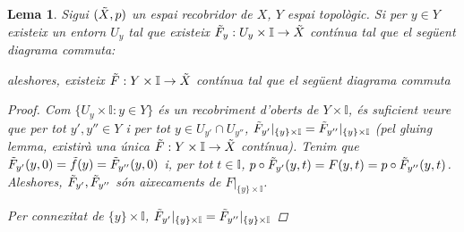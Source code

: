 \documentclass[compress,10pt]{article}
\newtheorem{lema}{Lema}[section]
\theoremstyle{definition}
\begin{document}
\begin{lema}
    Sigui $(\Tilde{X},p)$ un espai recobridor de $X$, $Y$ espai topològic. Si per $y\in Y$ existeix un entorn $U_{y}$ tal que existeix $\Tilde{F}_{y}:U_{y}\times\mathbb{I}\rightarrow\Tilde{X}$ contínua tal que el següent diagrama commuta:
    \begin{center}
    \end{center}
    aleshores, existeix $\Tilde{F}:Y\times\mathbb{I}\rightarrow\Tilde{X}$ contínua tal que el següent diagrama commuta
    \begin{center}
    \end{center}
    \begin{proof}
        Com $\{U_{y}\times\mathbb{I}:y\in Y\}$ és un recobriment d'oberts de $Y\times\mathbb{I}$, és suficient veure que per tot $y',y''\in Y$ i per tot $y\in U_{y'}\cap U_{y''}$, $\Tilde{F}_{y'}|_{\{y\}\times\mathbb{I}}=\Tilde{F}_{y''}|_{\{y\}\times\mathbb{I}}$ (pel \textit{gluing lemma}, existirà una única $\Tilde{F}:Y\times\mathbb{I}\rightarrow\Tilde{X}$ contínua).\newline
        Tenim que $\Tilde{F}_{y'}(y,0)=\Tilde{f}(y)=\Tilde{F}_{y''}(y,0)$ i, per tot $t\in\mathbb{I}$, $p\circ\Tilde{F}_{y'}(y,t)=F(y,t)=p\circ\Tilde{F}_{y''}(y,t)$. Aleshores, $\Tilde{F}_{y'},\Tilde{F}_{y''}$ són aixecaments de $F|_{\{y\}\times\mathbb{I}}$.
        \begin{center}
    \end{center}
        Per connexitat de $\{y\}\times\mathbb{I}$, $\Tilde{F}_{y'}|_{\{y\}\times\mathbb{I}}=\Tilde{F}_{y''}|_{\{y\}\times\mathbb{I}}$
    \end{proof}
\end{lema}
\end{document}
